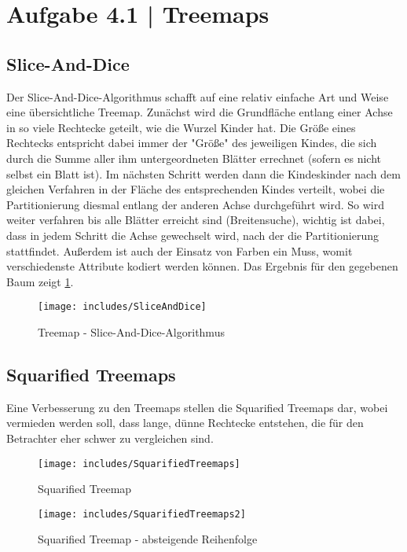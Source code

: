 \documentclass[a4paper,12pt,ngerman]{scrartcl}
\begin{document}
\pagestyle{fancy} %

\section{Aufgabe 4.1 | Treemaps}
\subsection*{Slice-And-Dice}

Der Slice-And-Dice-Algorithmus schafft auf eine relativ einfache Art und Weise eine übersichtliche Treemap. Zunächst wird die Grundfläche entlang einer Achse in so viele Rechtecke geteilt, wie die Wurzel Kinder hat. Die Größe eines Rechtecks entspricht dabei immer der "Größe" des jeweiligen Kindes, die sich durch die Summe aller ihm untergeordneten Blätter errechnet (sofern es nicht selbst ein Blatt ist). Im nächsten Schritt werden dann die Kindeskinder nach dem gleichen Verfahren in der Fläche des entsprechenden Kindes verteilt, wobei die Partitionierung diesmal entlang der anderen Achse durchgeführt wird. So wird weiter verfahren bis alle Blätter erreicht sind (Breitensuche), wichtig ist dabei, dass in jedem Schritt die Achse gewechselt wird, nach der die Partitionierung stattfindet. Außerdem ist auch der Einsatz von Farben ein Muss, womit verschiedenste Attribute kodiert werden können. Das Ergebnis für den gegebenen Baum zeigt \cref{fig:sliceAndDice}.

\begin{figure}[ht]
    \centering
    \texttt{[image: includes/SliceAndDice]}
    \caption{Treemap - Slice-And-Dice-Algorithmus}
    \label{fig:sliceAndDice}
\end{figure}

\subsection*{Squarified Treemaps}

Eine Verbesserung zu den Treemaps stellen die Squarified Treemaps dar, wobei vermieden werden soll, dass lange, dünne Rechtecke entstehen, die für den Betrachter eher schwer zu vergleichen sind.

\begin{figure}[ht]
    \centering
    \texttt{[image: includes/SquarifiedTreemaps]}
    \caption{Squarified Treemap}
    \label{fig:squarifiedTreemap}
\end{figure}

\begin{figure}[ht]
    \centering
    \texttt{[image: includes/SquarifiedTreemaps2]}
    \caption{Squarified Treemap - absteigende Reihenfolge}
    \label{fig:squarifiedTreemap2}
\end{figure}
\FloatBarrier
\end{document}
